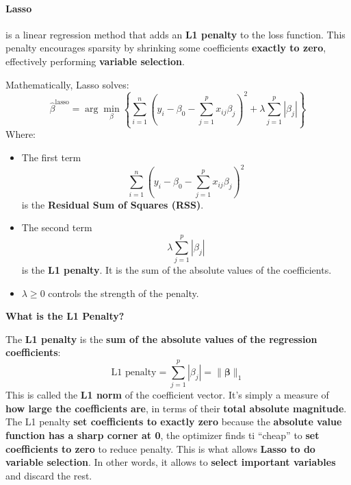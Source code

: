 \paragraph{Lasso}\label{paragraph: Lasso}

 is a linear regression method that adds an \textbf{L1 penalty} to the loss function. This penalty encourages sparsity by shrinking some coefficients \textbf{exactly to zero}, effectively performing \textbf{variable selection}.

\highspace
Mathematically, Lasso solves:
\begin{equation}
    \hat{\beta}^{\text{lasso}} = \arg\min_{\beta} \left\{ \sum_{i=1}^n \left(y_i - \beta_0 - \sum_{j=1}^p x_{ij} \beta_j \right)^2 + \lambda \sum_{j=1}^p |\beta_j| \right\}
\end{equation}
Where:
\begin{itemize}
    \item The first term
    \begin{equation*}
        \sum_{i=1}^n \left(y_i - \beta_0 - \sum_{j=1}^p x_{ij} \beta_j \right)^2
    \end{equation*}
    is the \textbf{Residual Sum of Squares (RSS)}.
    \item The second term
    \begin{equation*}
        \lambda \sum_{j=1}^p |\beta_j|
    \end{equation*}
    is the \textbf{L1 penalty}. It is the sum of the absolute values of the coefficients.
    \item $\lambda \geq 0$ controls the strength of the penalty.
\end{itemize}

\highspace
\begin{flushleft}
    \textcolor{Green3}{ \textbf{What is the L1 Penalty?}}
\end{flushleft}
The \textbf{L1 penalty} is the \textbf{sum of the absolute values of the regression coefficients}:
\begin{equation}
    \text{L1 penalty} = \sum_{j=1}^{p} |\beta_j| = \| \boldsymbol{\beta} \|_1
\end{equation}
This is called the \textbf{L1 norm} of the coefficient vector. It's simply a measure of \textbf{how large the coefficients are}, in terms of their \textbf{total absolute magnitude}. The L1 penalty \textbf{set coefficients to exactly zero} because the \textbf{absolute value function has a sharp corner at 0}, the optimizer finds ti ``cheap'' to \textbf{set coefficients to zero} to reduce penalty. This is what allows \textbf{Lasso to do variable selection}. In other words, it allows to \textbf{select important variables} and discard the rest.

